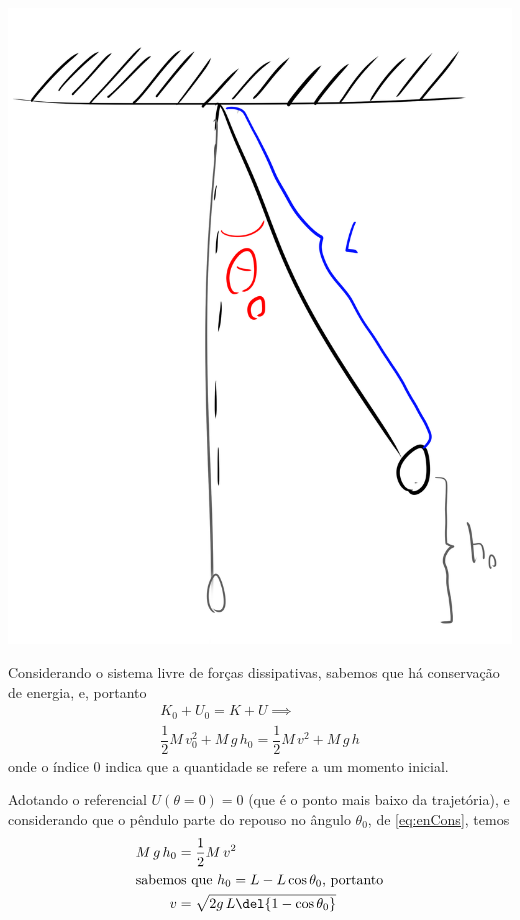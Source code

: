 \documentclass[]{IMTexam}
\begin{document}
\begin{questions}
\begin{parts}
		\begin{solution}
			\begin{multi}
				\includegraphics[width=1\linewidth]{fig6}

				\nextcol

				Considerando o sistema livre de forças dissipativas, sabemos que há conservação de energia, e, portanto
				\begin{align}
					K_0+U_0=K+U\implies \nonumber \\ \dfrac{1}{2}M\,v_0^{2}+M\,g\,h_0=\dfrac{1}{2}M\,v^{2}+M\,g\,h\label{eq:enCons}
				\end{align}
				onde o índice $ 0 $ indica que a quantidade se refere a um momento inicial.

				Adotando o referencial $ U(\theta=0)=0 $ (que é o ponto mais baixo da trajetória), e considerando que o pêndulo parte do repouso no ângulo $ \theta_0 $, de \ref{eq:enCons}, temos
				\begin{align*}
					M\,g\,h_0 & =\dfrac{1}{2}M\,v^{2}             \\
					\intertext{sabemos que $ h_0=L-L\cos\theta_0 $, portanto}
					v         & =\sqrt{2g\,L\del{1-\cos\theta_0}}
				\end{align*}
			\end{multi}
		\end{solution}


\end{parts}
\end{questions}
\end{document}
